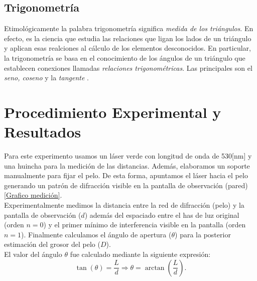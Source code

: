 \documentclass[10pt,a4paper]{article}
\begin{document}
\begin{multicols}{2}
		\subsection*{Trigonometría}
		Etimológicamente la palabra trigonometría significa \textit{medida de los triángulos}. En efecto, es la ciencia que estudia las relaciones que ligan los lados de un triángulo y aplican esas realciones al cálculo de los elementos desconocidos. En particular, la trigonometría se basa en el conocimiento de los ángulos de un triángulo que establecen conexiones llamadas \textit{relaciones trigonométricas}. Las principales son el \emph{seno, coseno} y la \emph{tangente} \cite{trigonometria}.
		\section{Procedimiento Experimental y Resultados}
		Para este experimento usamos un láser verde con longitud de onda de 530[nm] y una huincha para la medición de las distancias. Además, elaboramos un soporte manualmente para fijar el pelo. De esta forma, apuntamos el láser hacia el pelo generando un patrón de difracción visible en la pantalla de observación (pared) \ref{Grafico medición}.\\
		
		Experimentalmente medimos la distancia entre la red de difracción (pelo) y la pantalla de observación ($d$) además del  espaciado entre el has de luz original (orden $n = 0$) y el primer mínimo de interferencia visible en la pantalla (orden $n=1$). Finalmente calculamos el ángulo de apertura ($\theta$) para la posterior estimación del grosor del pelo ($D$).\\
		El valor del ángulo $\theta$ fue calculado mediante la siguiente expresión:
		\begin{equation} 
		\tan(\theta) = \frac{L}{d} \Longrightarrow \theta = \arctan(\frac{L}{d}).
		\end{equation}
		

\end{multicols}
\end{document}
